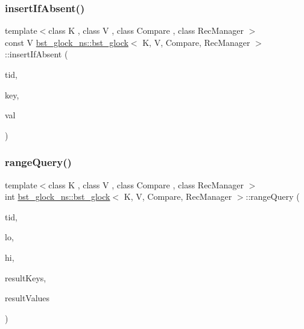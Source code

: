 \mbox{\label{classbst__glock__ns_1_1bst__glock_a61e825e84d189c8537431434537f24b3}} 
\subsubsection{\texorpdfstring{insert\+If\+Absent()}{insertIfAbsent()}}
{\footnotesize\ttfamily template$<$class K , class V , class Compare , class Rec\+Manager $>$ \\
const V \hyperlink{classbst__glock__ns_1_1bst__glock}{bst\+\_\+glock\+\_\+ns\+::bst\+\_\+glock}$<$ K, V, Compare, Rec\+Manager $>$\+::insert\+If\+Absent (\begin{DoxyParamCaption}\item[{const int}]{tid,  }\item[{const K \&}]{key,  }\item[{const V \&}]{val }\end{DoxyParamCaption})\hspace{0.3cm}{\ttfamily [inline]}}

\mbox{\label{classbst__glock__ns_1_1bst__glock_a1da5b0856cbf065c8fc1f29154a24bfc}} 
\subsubsection{\texorpdfstring{range\+Query()}{rangeQuery()}}
{\footnotesize\ttfamily template$<$class K , class V , class Compare , class Rec\+Manager $>$ \\
int \hyperlink{classbst__glock__ns_1_1bst__glock}{bst\+\_\+glock\+\_\+ns\+::bst\+\_\+glock}$<$ K, V, Compare, Rec\+Manager $>$\+::range\+Query (\begin{DoxyParamCaption}\item[{const int}]{tid,  }\item[{const K \&}]{lo,  }\item[{const K \&}]{hi,  }\item[{K $\ast$const}]{result\+Keys,  }\item[{V $\ast$const}]{result\+Values }\end{DoxyParamCaption})\hspace{0.3cm}{\ttfamily [inline]}}



